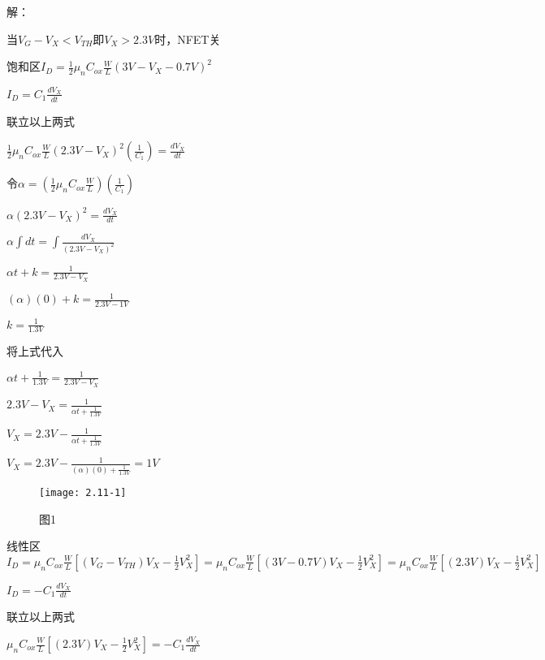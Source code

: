 




解：

\scalebox{3}{（a）}

当$V_G-V_X<V_{TH}$即$V_X>2.3V$时，NFET关

饱和区$I_D=\frac{1}{2}\mu_nC_{ox}\frac{W}{L}(3V-V_X-0.7V)^2$

$I_D=C_1\frac{dV_X}{dt}$

联立以上两式

$\frac{1}{2}\mu_nC_{ox}\frac{W}{L}(2.3V-V_X)^2(\frac{1}{C_1})=\frac{dV_X}{dt}$

令$\alpha=(\frac{1}{2}\mu_nC_{ox}\frac{W}{L})(\frac{1}{C_1})$

$\alpha (2.3V-V_X)^2=\frac{dV_X}{dt}$

$\alpha \int dt =\int \frac{dV_X}{(2.3V-V_X)^2}$

$\alpha t+k=\frac{1}{2.3V-V_X}$

$(\alpha) (0)+k=\frac{1}{2.3V-1V}$

$k=\frac{1}{1.3V}$

将上式代入

$\alpha t+\frac{1}{1.3V}=\frac{1}{2.3V-V_X}$

$2.3V-V_X=\frac{1}{\alpha t+\frac{1}{1.3V}}$

$V_X=2.3V-\frac{1}{\alpha t+\frac{1}{1.3V}}$

$V_X=2.3V-\frac{1}{(\alpha) (0)+\frac{1}{1.3V}}=1V$

		\begin{figure}[H] %
	\begin{minipage}{\linewidth}
		\texttt{[image: 2.11-1]}
	\end{minipage}
	\caption*{图1} %
\end{figure}

\scalebox{3}{（b）}

线性区$I_D=\mu_nC_{ox}\frac{W}{L}[(V_{G}-V_{TH})V_{X}-\frac{1}{2}V_{X}^2]=\mu_nC_{ox}\frac{W}{L}[(3V-0.7V)V_{X}-\frac{1}{2}V_{X}^2]=\mu_nC_{ox}\frac{W}{L}[(2.3V)V_{X}-\frac{1}{2}V_{X}^2]$

$I_D=-C_1\frac{dV_X}{dt}$

联立以上两式

$\mu_nC_{ox}\frac{W}{L}[(2.3V)V_{X}-\frac{1}{2}V_{X}^2]=-C_1\frac{dV_X}{dt}$

